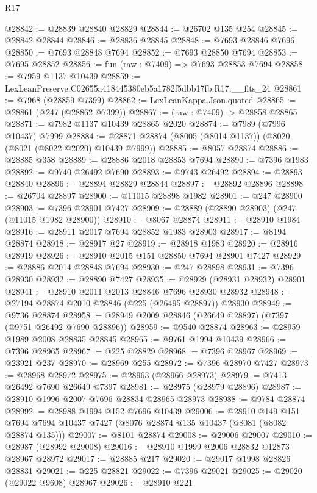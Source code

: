 \begin{lexlean}{R17}
\begin{coremodule}
@28842 := @28839 @28840 @28829
@28844 := @26702 @135 @254
@28845 := @28842 @28844
@28846 := @28836 @28845
@28848 := @7693 @28846 @7696
@28850 := @7693 @28848 @7694
@28852 := @7693 @28850 @7694
@28853 := @7695 @28852
@28856 := fun (raw : @7409) => @7693 @28853 @7694
@28858 := @7959 @1137 @10439
@28859 := LexLeanPreserve.C02655a418445380eb5a1782f5dbb17fb.R17.__fits_24
@28861 := @7968 (@28859 @7399)
@28862 := LexLeanKappa.Json.quoted
@28865 := @28861 (@247 (@28862 @7399))
@28867 := (raw : @7409) -> @28858 @28865
@28871 := @7982 @1137 @10439 @28865 @2020
@28874 := @7989 (@7996 @10437) @7999
@28884 := @28871 @28874 (@8005 (@8014 @1137)) (@8020 (@8021 (@8022 @2020) @10439 @7999))
@28885 := @8057 @28874
@28886 := @28885 @358
@28889 := @28886 @2018 @28853 @7694
@28890 := @7396 @1983
@28892 := @9740 @26492 @7690
@28893 := @9743 @26492
@28894 := @28893 @28840
@28896 := @28894 @28829 @28844
@28897 := @28892 @28896
@28898 := @26704 @28897
@28900 := @11015 @28898 @1982
@28901 := @247 @28900
@28903 := @7396 @28901 @7427
@28909 := @28889 (@28890 @28903) (@247 (@11015 @1982 @28900))
@28910 := @8067 @28874
@28911 := @28910 @1984
@28916 := @28911 @2017 @7694 @28852 @1983 @28903
@28917 := @8194 @28874
@28918 := @28917 @27
@28919 := @28918 @1983
@28920 := @28916 @28919
@28926 := @28910 @2015 @151 @28850 @7694 @28901 @7427
@28929 := @28886 @2014 @28848 @7694
@28930 := @247 @28898
@28931 := @7396 @28930
@28932 := @28890 @7427
@28935 := @28929 (@28931 @28932) @28901
@28941 := @28910 @2011 @2013 @28846 @7696 @28930 @28932
@28948 := @27194 @28874 @2010 @28846 (@225 (@26495 @28897)) @28930
@28949 := @9736 @28874
@28958 := @28949 @2009 @28846 (@26649 @28897) (@7397 (@9751 @26492 @7690 @28896))
@28959 := @9540 @28874
@28963 := @28959 @1989 @2008 @28835 @28845
@28965 := @9761 @1994 @10439
@28966 := @7396 @28965
@28967 := @225 @28829
@28968 := @7396 @28967
@28969 := @23921 @237
@28970 := @28969 @255
@28972 := @7396 @28970 @7427
@28973 := @28968 @28972
@28975 := @28963 (@28966 @28973)
@28979 := @7413 @26492 @7690 @26649 @7397
@28981 := @28975 (@28979 @28896)
@28987 := @28910 @1996 @2007 @7696 @28834 @28965 @28973
@28988 := @9784 @28874
@28992 := @28988 @1994 @152 @7696 @10439
@29006 := @28910
    @149
    @151
    @7694
    @7694
    @10437
    @7427
    (@8076 @28874 @135 @10437 (@8081 (@8082 @28874 @135)))
@29007 := @8101 @28874
@29008 := @29006 @29007
@29010 := @28987 (@28992 @29008)
@29016 := @28910 @1999 @2006 @28832 @12873 @28967 @28972
@29017 := @28885 @217
@29020 := @29017 @1998 @28826 @28831
@29021 := @225 @28821
@29022 := @7396 @29021
@29025 := @29020 (@29022 @9608) @28967
@29026 := @28910 @221

\end{coremodule}
\end{lexlean}
